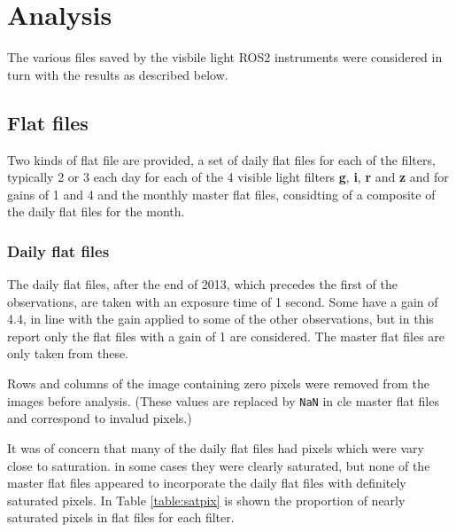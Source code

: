 \section{Analysis}
\protect\label{section:tanalysis}

The various files saved by the visbile light ROS2 instruments were considered in
turn with the results as described below.

\subsection{Flat files}
\protect\label{section:flatfiles}

Two kinds of flat file are provided, a set of daily flat files for each of the
filters, typically 2 or 3 each day for each of the 4 visible light filters \textbf{g},
\textbf{i}, \textbf{r} and \textbf{z} and for gains of 1 and 4 and the monthly
master flat files, considting of a composite of the daily flat files for the
month.

\subsubsection{Daily flat files}
\protect\label{section:dailyflatfiles}

The daily flat files, after the end of 2013, which precedes the first of the
observations, are taken with an exposure time of 1 second. Some have a gain of
4.4, in line with the gain applied to some of the other observations, but in
this report only the flat files with a gain of 1 are considered. The master flat
files are only taken from these.

Rows and columns of the image containing zero pixels were removed from the
images before analysis. (These values are replaced by \texttt{NaN} in cle master
flat files and correspond to invalud pixels.)

It was of concern that many of the daily flat files had pixels which were vary
close to saturation. in some cases they were clearly saturated, but none of the
master flat files appeared to incorporate the daily flat files with definitely
saturated pixels. In Table \ref{table:satpix} is shown the proportion of
nearly saturated pixels in flat files for each filter.

